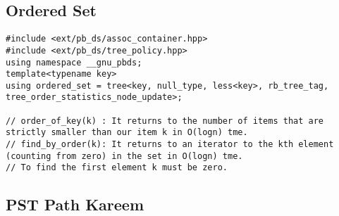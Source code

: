 \subsection{Ordered Set}

\begin{lstlisting}[style=cpp]
#include <ext/pb_ds/assoc_container.hpp>
#include <ext/pb_ds/tree_policy.hpp>
using namespace __gnu_pbds;
template<typename key>
using ordered_set = tree<key, null_type, less<key>, rb_tree_tag, tree_order_statistics_node_update>;

// order_of_key(k) : It returns to the number of items that are strictly smaller than our item k in O(logn) tme.
// find_by_order(k): It returns to an iterator to the kth element (counting from zero) in the set in O(logn) tme.
// To find the first element k must be zero.
\end{lstlisting}

\subsection{PST Path Kareem}

